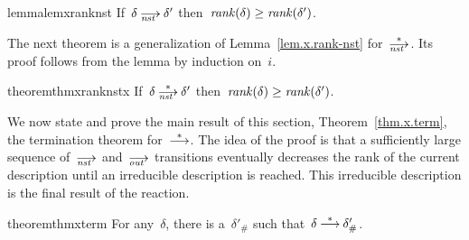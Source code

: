 
\begin{restatable}{lemma}{lemxranknst}
  \label{lem.x.rank-nst}
  If~$\delta\nst\delta'$ then~$\operatorname{\mathit{rank}}(\delta)\ge\operatorname{\mathit{rank}}(\delta')$.
\end{restatable}

The next theorem is a generalization of Lemma~\ref{lem.x.rank-nst}
for~$\nst[*]$.  Its proof follows from the lemma by induction on~$i$.

\begin{restatable}{theorem}{thmxranknstx}
  \label{thm.x.rank-nst-*}
  If~$\delta\nst[*]\delta'$ then~$\operatorname{\mathit{rank}}(\delta)\ge\operatorname{\mathit{rank}}(\delta')$.
\end{restatable}

We now state and prove the main result of this section,
Theorem~\ref{thm.x.term}, the termination theorem for~$\trans[*]$.  The idea
of the proof is that a sufficiently large sequence of~$\nst$ and~$\out$
transitions eventually decreases the rank of the current description until
an irreducible description is reached.  This irreducible description is the
final result of the reaction.
\begin{restatable}[Termination]{theorem}{thmxterm}
  \label{thm.x.term}
  For any~$\delta$, there is a~$\delta'_\#$ such
  that~$\delta\trans[*]\delta'_\#$.
\end{restatable}
